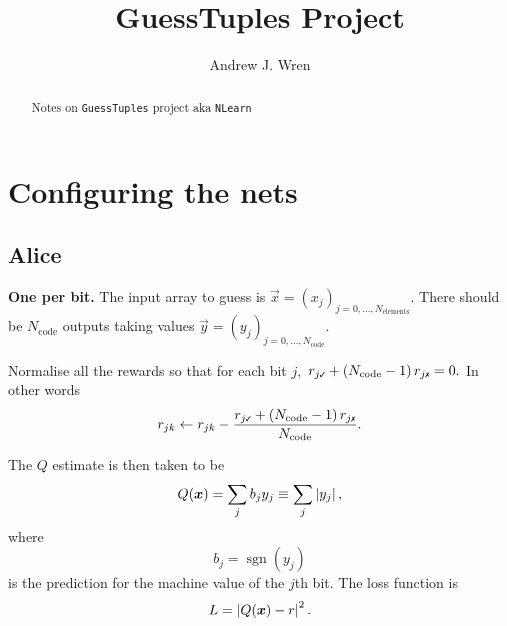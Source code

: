 \documentclass[12pt]{article}
\title{GuessTuples Project}
\author{Andrew J. Wren}
\begin{document}
\maketitle

\begin{abstract}
	Notes on \texttt{GuessTuples} project aka \texttt{NLearn}
\end{abstract}


\section{Configuring the nets}\label{sec:configuring-the-nets}

\subsection{Alice}

{\bf One per bit.} The input array to guess is $\vec{x}=(x_j)_{j=0,...,N_\text{elements}}.$  There should be $N_\text{code}$ outputs taking values $\vec{y} = (y_j)_{j=0,...,N_\text{code}}.$

Normalise all the rewards so that for each bit $j,$ $\rt{j} + \left(N_\text{code} - 1\right)\rf{j} = 0.$  In other words
\begin{equation}
	r_{jk}
	\gets
	r_{jk} - \frac{ \rt{j} + \left(N_\text{code} - 1\right)\rf{j}}{N_\text{code}}
	.
\end{equation}

The $Q$ estimate is then taken to be
\begin{equation}
	Q(\boldsymbol{x})
	=
	\sum_j b_j y_j
	\equiv
	\sum_j \left\lvert y_j \right\rvert
	,		
\end{equation}
where
\begin{equation}
	b_j = \operatorname{sgn} (y_j)
\end{equation}
is the prediction for the machine value of the $j$th bit.  The loss function is
\begin{equation}
	L
	=
	\left\lvert Q(\boldsymbol{x}) -r \right\rvert^2
	. 
\end{equation}
\end{document}

